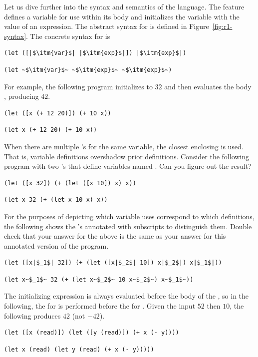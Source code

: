 \documentclass[11pt]{book}
\begin{document}
Let us dive further into the syntax and semantics of the \LangVar{}
language.  The  feature defines a variable for use within its
body and initializes the variable with the value of an expression.
The abstract syntax for  is defined in
Figure~\ref{fig:r1-syntax}.  The concrete syntax for  is
\begin{lstlisting}
(let ([|$\itm{var}$| |$\itm{exp}$|]) |$\itm{exp}$|)
\end{lstlisting}
\begin{lstlisting}[style=ocaml]
(let ~$\itm{var}$~ ~$\itm{exp}$~ ~$\itm{exp}$~)
\end{lstlisting}
For example, the following program initializes  to $32$ and then
evaluates the body , producing $42$.
\begin{lstlisting}
(let ([x (+ 12 20)]) (+ 10 x))
\end{lstlisting}
\begin{lstlisting}[style=ocaml]
(let x (+ 12 20) (+ 10 x))
\end{lstlisting}
When there are multiple 's for the same variable, the closest
enclosing  is used. That is, variable definitions overshadow
prior definitions. Consider the following program with two 's
that define variables named . Can you figure out the result?
\begin{lstlisting}
(let ([x 32]) (+ (let ([x 10]) x) x))
\end{lstlisting}
\begin{lstlisting}[style=ocaml]
(let x 32 (+ (let x 10 x) x))
\end{lstlisting}
For the purposes of depicting which variable uses correspond to which
definitions, the following shows the 's annotated with
subscripts to distinguish them. Double check that your answer for the
above is the same as your answer for this annotated version of the
program.
\begin{lstlisting}
(let ([x|$_1$| 32]) (+ (let ([x|$_2$| 10]) x|$_2$|) x|$_1$|))
\end{lstlisting}
\begin{lstlisting}[style=ocaml]
(let x~$_1$~ 32 (+ (let x~$_2$~ 10 x~$_2$~) x~$_1$~))
\end{lstlisting}
The initializing expression is always evaluated before the body of the
, so in the following, the  for  is
performed before the  for . Given the input
$52$ then $10$, the following produces $42$ (not $-42$).
\begin{lstlisting}
(let ([x (read)]) (let ([y (read)]) (+ x (- y))))
\end{lstlisting}
\begin{lstlisting}[style=ocaml]
(let x (read) (let y (read) (+ x (- y)))))
\end{lstlisting}
\end{document}
